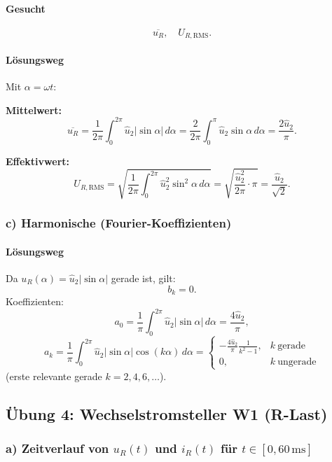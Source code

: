 \paragraph{Gesucht}
\[
\overline{u_R},\quad U_{R,\mathrm{RMS}}.
\]

\paragraph{Lösungsweg}
Mit $\alpha=\omega t$:

\textbf{Mittelwert:}
\[
\overline{u_R}
=\frac{1}{2\pi}\int_0^{2\pi}\hat u_2|\sin\alpha|\,d\alpha
=\frac{2}{2\pi}\int_0^{\pi}\hat u_2\sin\alpha\,d\alpha
=\boxed{\frac{2\hat u_2}{\pi}}.
\]

\textbf{Effektivwert:}
\[
U_{R,\mathrm{RMS}}
=\sqrt{\frac{1}{2\pi}\int_0^{2\pi}\hat u_2^2\sin^2\alpha\,d\alpha}
=
\sqrt{\frac{\hat u_2^2}{2\pi}\cdot\pi}
=
\boxed{\frac{\hat u_2}{\sqrt{2}}}.
\]

\subsubsection*{c) Harmonische (Fourier-Koeffizienten)}

\paragraph{Lösungsweg}
Da $u_R(\alpha)=\hat u_2|\sin\alpha|$ gerade ist, gilt:
\[
b_k=0.
\]
Koeffizienten:
\[
a_0=\frac{1}{\pi}\int_0^{2\pi}\hat u_2|\sin\alpha|\,d\alpha=\boxed{\frac{4\hat u_2}{\pi}},
\]
\[
a_k=\frac{1}{\pi}\int_0^{2\pi}\hat u_2|\sin\alpha|\cos(k\alpha)\,d\alpha
=
\begin{cases}
-\frac{4\hat u_2}{\pi}\frac{1}{k^2-1}, & k\ \text{gerade}\\
0, & k\ \text{ungerade}
\end{cases}
\]
(erste relevante gerade $k=2,4,6,\dots$).



\subsection{Übung 4: Wechselstromsteller W1 (R-Last)}

\subsubsection*{a) Zeitverlauf von $u_R(t)$ und $i_R(t)$ für $t\in[0,60\,\mathrm{ms}]$}

